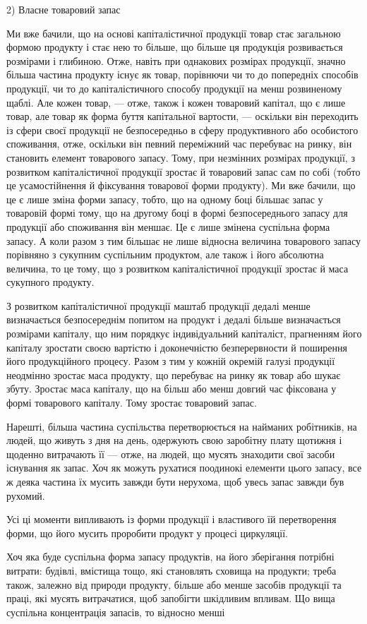 \parcont{}  %
2) Власне товаровий запас

Ми вже бачили, що на основі капіталістичної продукції товар стає
загальною формою продукту і стає нею то більше, що більше ця продукція
розвивається розмірами і глибиною. Отже, навіть при однакових
розмірах продукції, значно більша частина продукту існує як товар, порівнючи
чи то до попередніх способів продукції, чи то до капіталістичного
способу продукції на менш розвиненому щаблі. Але кожен товар,
— отже, також і кожен товаровий капітал, що є лише товар, але товар
як форма буття капітальної вартости, — оскільки він переходить із
сфери своєї продукції не безпосередньо в сферу продуктивного або
особистого споживання, отже, оскільки він певний переміжний час
перебуває на ринку, він становить елемент товарового запасу. Тому,
при незмінних розмірах продукції, з розвитком капіталістичної продукції
зростає й товаровий запас сам по собі (тобто це усамостійнення й фіксування
товарової форми продукту). Ми вже бачили, що це є лише зміна
форми запасу, тобто, що на одному боці більшає запас у товаровій
формі тому, що на другому боці в формі безпосереднього запасу для
продукції або споживання він меншає. Це є лише змінена суспільна
форма запасу. А коли разом з тим більшає не лише відносна величина
товарового запасу порівняно з сукупним суспільним продуктом, але також
і його абсолютна величина, то це тому, що з розвитком капіталістичної
продукції зростає й маса сукупного продукту.

З розвитком капіталістичної продукції маштаб продукції дедалі менше
визначається безпосереднім попитом на продукт і дедалі більше визначається
розмірами капіталу, що ним порядкує індивідуальний капіталіст,
прагненням його капіталу зростати своєю вартістю і доконечністю безперервности
й поширення його продукційного процесу. Разом з тим у
кожній окремій галузі продукції неодмінно зростає маса продукту, що
перебуває на ринку як товар або шукає збуту. Зростає маса капіталу, що
на більш або менш довгий час фіксована у формі товарового капіталу.
Тому зростає товаровий запас.

Нарешті, більша частина суспільства перетворюється на найманих
робітників, на людей, що живуть з дня на день, одержують свою заробітну
плату щотижня і щоденно витрачають її — отже, на людей, що
мусять знаходити свої засоби існування як запас. Хоч як можуть рухатися
поодинокі елементи цього запасу, все ж деяка частина їх мусить
завжди бути нерухома, щоб увесь запас завжди був рухомий.

Усі ці моменти випливають із форми продукції і властивого їй
перетворення форми, що його мусить проробити продукт у процесі
циркуляції.

Хоч яка буде суспільна форма запасу продуктів, на його зберігання потрібні
витрати: будівлі, вмістища тощо, які становлять сховища на продукти;
треба також, залежно від природи продукту, більше або менше засобів продукції
та праці, які мусять витрачатися, щоб запобігти шкідливим
впливам. Що вища суспільна концентрація запасів, то відносно менші
\parbreak{}  %
